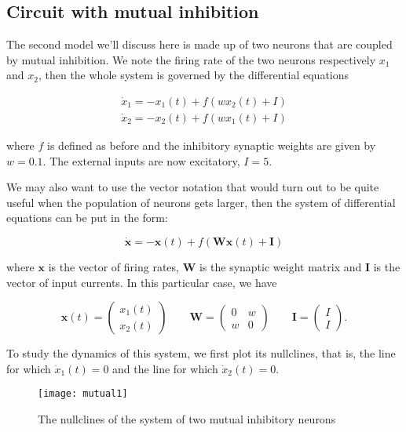 \subsection{Circuit with mutual inhibition}

The second model we'll discuss here is made up of two neurons that are coupled
by mutual inhibition. We note the firing rate of the two neurons respectively
$x_1$ and $x_2$, then the whole system is governed by the differential
equations

\begin{gather*}
  \dot{x}_1 = -x_1(t) + f(wx_2(t) + I)\\
  \dot{x}_2 = -x_2(t) + f(wx_1(t) + I)
\end{gather*}

\noindent
where $f$ is defined as before and the inhibitory synaptic weights are given
by $w = 0.1$. The external inputs are now excitatory, $I = 5$.

We may also want to use the vector notation that would turn out to be quite
useful when the population of neurons gets larger, then the system of
differential equations can be put in the form:

\[\dot{\mathbf{x}} = -\mathbf{x}(t) + f(\mathbf{Wx}(t) + \mathbf{I})\]

\noindent
where $\mathbf{x}$ is the vector of firing rates, $\mathbf{W}$ is the synaptic 
weight matrix and $\mathbf{I}$ is the vector of input currents. In this
particular case, we have

\[
  \mathbf{x}(t) = \left(
    \begin{array}{c}
      x_1(t)\\
      x_2(t)
    \end{array}\right) \qquad
  \mathbf{W} = \left(
    \begin{array}{cc}
      0 & w\\
      w & 0
    \end{array}\right) \qquad
  \mathbf{I} = \left(
    \begin{array}{c}
      I\\
      I
    \end{array}\right).
\]

To study the dynamics of this system, we first plot its nullclines, that is,
the line for which $\dot{x}_1(t)=0$ and the line for which $\dot{x}_2(t)=0$.

\begin{figure}[H]
  \centering
  \texttt{[image: mutual1]}
  \caption
    {The nullclines of the system of two mutual inhibitory neurons}
\end{figure}

